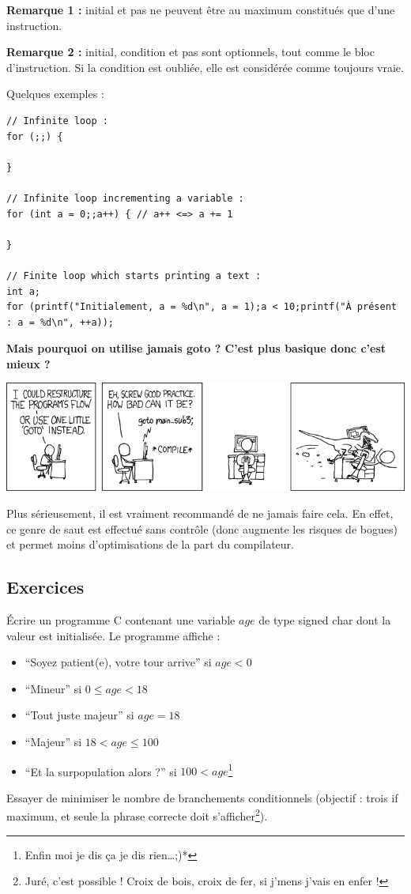 \documentclass[../../../main.tex]{subfiles}
\begin{document}
\textbf{Remarque 1 :} \textsf{initial} et \textsf{pas} ne peuvent être au maximum constitués que d'une instruction.
 
\textbf{Remarque 2 :} \textsf{initial}, \textsf{condition} et \textsf{pas} sont optionnels, tout comme le bloc d'instruction. Si la condition est oubliée, elle est considérée comme toujours vraie.
 
Quelques exemples :
\begin{verbatim}
// Infinite loop :
for (;;) {
	
}

// Infinite loop incrementing a variable :
for (int a = 0;;a++) { // a++ <=> a += 1
	
}

// Finite loop which starts printing a text :
int a;
for (printf("Initialement, a = %d\n", a = 1);a < 10;printf("À présent : a = %d\n", ++a));
\end{verbatim}
\textbf{Mais pourquoi on utilise jamais \textsf{goto} ? C'est plus basique donc c'est mieux ?}
 
\begin{minipage}{\textwidth}
	\begin{center}
		\includegraphics[width=\textwidth]{meme2}
	\end{center}
\end{minipage}
 
Plus sérieusement, il est vraiment recommandé de ne jamais faire cela. En effet, ce genre de saut est effectué sans contrôle (donc augmente les risques de bogues) et permet moins d'optimisations de la part du compilateur.
\subsection{Exercices}
 Écrire un programme C contenant une variable $age$ de type \textsf{signed char} dont la valeur est initialisée. Le programme affiche :
\begin{itemize}
	\item ``Soyez patient(e), votre tour arrive'' si $age < 0$
	\item ``Mineur'' si $0 \leq age < 18$
	\item ``Tout juste majeur'' si $age = 18$
	\item ``Majeur'' si $18 < age \leq{100}$
	\item ``Et la surpopulation alors ?'' si $100 < age$\footnote{Enfin moi je dis ça je dis rien\dots;)*}
\end{itemize}
Essayer de minimiser le nombre de branchements conditionnels (objectif : trois \textsf{if} maximum, et seule la phrase correcte doit s'afficher\footnote{Juré, c'est possible ! Croix de bois, croix de fer, si j'mens j'vais en enfer !}).
 
\end{document}
